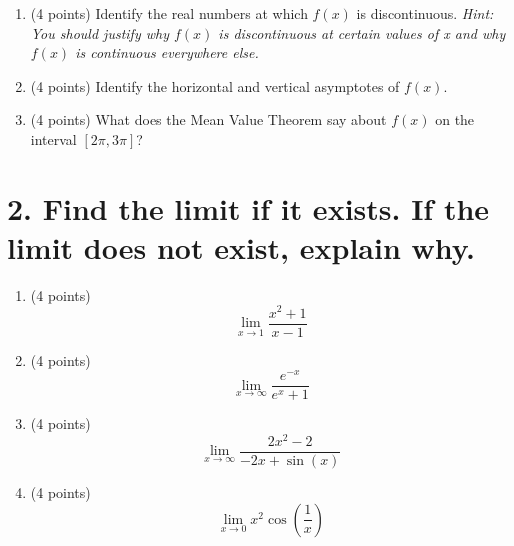\documentclass[12pt]{article}
\begin{document}
\begin{enumerate}[label=(\alph*)]
    \item (4 points) Identify the real numbers at which $f(x)$ is discontinuous.
    \textit{Hint: You should justify why $f(x)$ is discontinuous at certain values of x and why $f(x)$ is continuous everywhere else.}
    
    \vspace{4cm}
    
    \item (4 points) Identify the horizontal and vertical asymptotes of $f(x)$.
    
    \vspace{4cm}

    \item (4 points) What does the Mean Value Theorem say about $f(x)$ on the interval $[2\pi, 3\pi]$?
    
    \vspace{4cm}
    
\end{enumerate}

\newpage

\section*{2. Find the limit if it exists. If the limit does not exist, explain why.}

\begin{enumerate}[label=(\alph*)]
    \item (4 points)
    \[ \lim_{x\to 1} \frac{x^2+1}{x-1} \]
    
    \vspace{4cm}
    
    \item (4 points)
    \[ \lim_{x\to \infty} \frac{e^{-x}}{e^x+1} \]
    
    \vspace{4cm}
    
    \item (4 points)
    \[ \lim_{x\to \infty} \frac{2x^2-2}{-2x+\sin(x)} \]
    
    \vspace{4cm}
    
    \item (4 points)
    \[ \lim_{x\to 0} x^2 \cos\left(\frac{1}{x}\right) \]
    
    \vspace{4cm}
    
\end{enumerate}
\end{document}

